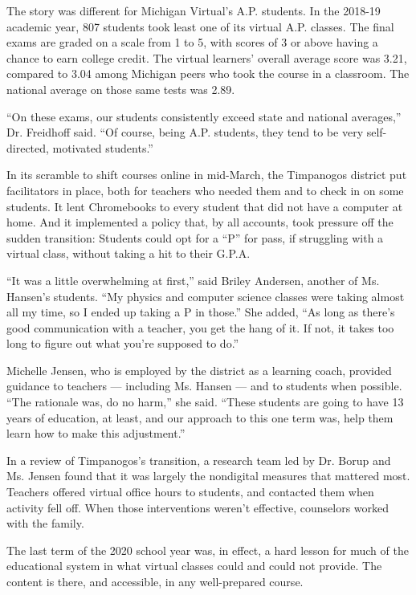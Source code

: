 The story was different for Michigan Virtual's A.P. students. In the
2018-19 academic year, 807 students took least one of its virtual A.P.
classes. The final exams are graded on a scale from 1 to 5, with scores
of 3 or above having a chance to earn college credit. The virtual
learners' overall average score was 3.21, compared to 3.04 among
Michigan peers who took the course in a classroom. The national average
on those same tests was 2.89.

``On these exams, our students consistently exceed state and national
averages,'' Dr. Freidhoff said. ``Of course, being A.P. students, they
tend to be very self-directed, motivated students.''

In its scramble to shift courses online in mid-March, the Timpanogos
district put facilitators in place, both for teachers who needed them
and to check in on some students. It lent Chromebooks to every student
that did not have a computer at home. And it implemented a policy that,
by all accounts, took pressure off the sudden transition: Students could
opt for a ``P'' for pass, if struggling with a virtual class, without
taking a hit to their G.P.A.

``It was a little overwhelming at first,'' said Briley Andersen, another
of Ms. Hansen's students. ``My physics and computer science classes were
taking almost all my time, so I ended up taking a P in those.'' She
added, ``As long as there's good communication with a teacher, you get
the hang of it. If not, it takes too long to figure out what you're
supposed to do.''

Michelle Jensen, who is employed by the district as a learning coach,
provided guidance to teachers --- including Ms. Hansen --- and to
students when possible. ``The rationale was, do no harm,'' she said.
``These students are going to have 13 years of education, at least, and
our approach to this one term was, help them learn how to make this
adjustment.''

In a review of Timpanogos's transition, a research team led by Dr. Borup
and Ms. Jensen found that it was largely the nondigital measures that
mattered most. Teachers offered virtual office hours to students, and
contacted them when activity fell off. When those interventions weren't
effective, counselors worked with the family.

The last term of the 2020 school year was, in effect, a hard lesson for
much of the educational system in what virtual classes could and could
not provide. The content is there, and accessible, in any well-prepared
course.

